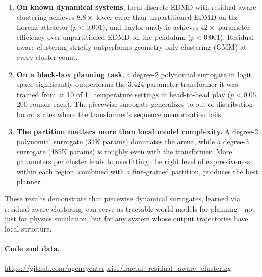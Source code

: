 \documentclass[11pt]{article}
\theoremstyle{definition}
\begin{document}
\begin{enumerate}[leftmargin=*,itemsep=2pt]
  \item \textbf{On known dynamical systems}, local discrete EDMD with residual-aware clustering achieves $8.8\times$ lower error than unpartitioned EDMD on the Lorenz attractor ($p<0.001$), and Taylor-analytic achieves $42\times$ parameter efficiency over unpartitioned EDMD on the pendulum ($p<0.001$). Residual-aware clustering strictly outperforms geometry-only clustering (GMM) at every cluster count.
  \item \textbf{On a black-box planning task}, a degree-2 polynomial surrogate in logit space significantly outperforms the 3,424-parameter transformer it was trained from at 10 of 11 temperature settings in head-to-head play ($p<0.05$, 200 rounds each). The piecewise surrogate generalizes to out-of-distribution board states where the transformer's sequence memorization fails.
  \item \textbf{The partition matters more than local model complexity.} A degree-2 polynomial surrogate (31K params) dominates the arena, while a degree-3 surrogate (485K params) is roughly even with the transformer. More parameters per cluster leads to overfitting; the right level of expressiveness within each region, combined with a fine-grained partition, produces the best planner.
\end{enumerate}

These results demonstrate that piecewise dynamical surrogates, learned via residual-aware clustering, can serve as tractable world models for planning---not just for physics simulation, but for any system whose output trajectories have local structure.

\paragraph{Code and data.} \url{https://github.com/agencyenterprise/fractal_residual_aware_clustering}
\end{document}
